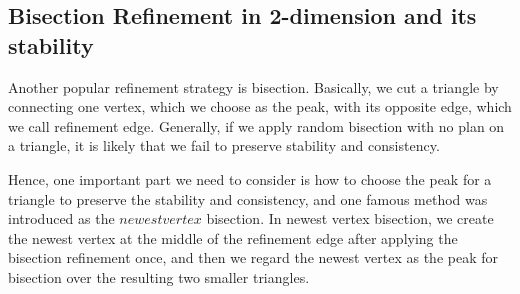    \subsection{Bisection Refinement in 2-dimension and its stability}
    Another popular refinement strategy is bisection. Basically, we cut a triangle by connecting one vertex, which we choose as the peak, with its opposite edge, which we call refinement edge. Generally, if we apply random bisection with no plan on a triangle, it is likely that we fail to preserve stability and consistency.

    Hence, one important part we need to consider is how to choose the peak for a triangle to preserve the stability and consistency, and one famous method was introduced as the $newest vertex$ bisection. In newest vertex bisection, we create the newest vertex at the middle of the refinement edge after applying the bisection refinement once, and then we regard the newest vertex as the peak for bisection over the resulting two smaller triangles.

